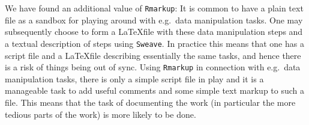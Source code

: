 \documentclass[11pt, a4paper]{article}
\newcommand{\pkg}[1]{{\normalfont\fontseries{b}\selectfont #1}}
\let\proglang=\textit
\let\code=\texttt
\begin{document}
We have found an additional value of \code{Rmarkup}: It is common to
have a plain text file as a sandbox for playing around with e.g.\ data
manipulation tasks. One may subsequently choose to form a \LaTeX file
with these data manipulation steps and a textual description of steps
using \code{Sweave}. In practice this means that one has a script file
and a \LaTeX file describing essentially the same tasks, and hence
there is a risk of things being out of sync. Using \code{Rmarkup} in
connection with e.g.\ data manipulation tasks, there is only a simple
script file in play and it is a manageable task to add useful
comments and some simple text markup to such a file. This means that
the task of documenting the work (in particular the more tedious parts
of the work) is more likely to be done.













\end{document}
